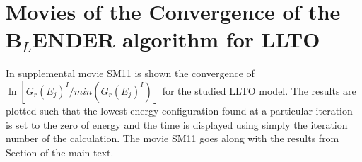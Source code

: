 \documentclass[a4paper,12pt]{article}
\begin{document}
\section{Movies of the Convergence of the B$_L$ENDER algorithm for LLTO}
In supplemental movie SM11 is shown the convergence of $\ln[G_r(E_j)^I/min(G_r(E_j)^I)]$ for the studied LLTO model. The results are plotted such that the lowest energy configuration found at a particular iteration is set to the zero of energy and the  time is displayed using simply the iteration number of the calculation.  The movie SM11 goes along with the results from Section  of the main text. 



\end{document}
